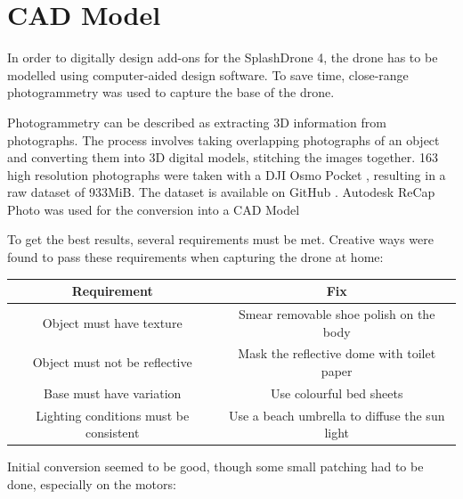 \newpage
\section{CAD Model}
In order to digitally design add-ons for the SplashDrone 4, the drone has to be modelled using computer-aided design software. To save time, close-range photogrammetry was used to capture the base of the drone.

Photogrammetry can be described as extracting 3D information from photographs. The process involves taking overlapping photographs of an object and converting them into 3D digital models, stitching the images together. 163 high resolution photographs were taken with a DJI Osmo Pocket \cite{osmopocket}, resulting in a raw dataset of 933MiB. The dataset is available on GitHub \cite{dronemodel}. Autodesk ReCap Photo was used for the conversion into a CAD Model \cite{autodeskrecap}

To get the best results, several requirements must be met. Creative ways were found to pass these requirements when capturing the drone at home:

\begin{center}
\begin{tabular}{ |c|c| } 
 \hline
 Requirement & Fix  \\ 
 \hline
 Object must have texture & Smear removable shoe polish on the body \\ 
 Object must not be reflective & Mask the reflective dome with toilet paper \\ 
 Base must have variation & Use colourful bed sheets \\ 
 Lighting conditions must be consistent & Use a beach umbrella to diffuse the sun light \\ 
 \hline
\end{tabular}
\end{center}

Initial conversion seemed to be good, though some small patching had to be done, especially on the motors:

